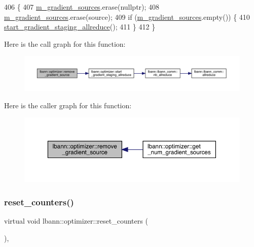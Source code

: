 \begin{DoxyCode}
406                                                          \{
407   \hyperlink{classlbann_1_1optimizer_aadfa322a683c2b826d0fae5f809298df}{m\_gradient\_sources}.erase(\textcolor{keyword}{nullptr});
408   \hyperlink{classlbann_1_1optimizer_aadfa322a683c2b826d0fae5f809298df}{m\_gradient\_sources}.erase(source);
409   \textcolor{keywordflow}{if} (\hyperlink{classlbann_1_1optimizer_aadfa322a683c2b826d0fae5f809298df}{m\_gradient\_sources}.empty()) \{
410     \hyperlink{classlbann_1_1optimizer_a1fe495ccbd62d50735615818abecf454}{start\_gradient\_staging\_allreduce}();
411   \}
412 \}
\end{DoxyCode}
Here is the call graph for this function\+:\nopagebreak
\begin{figure}[H]
\begin{center}
\leavevmode
\includegraphics[width=350pt]{classlbann_1_1optimizer_a68ba7515d7eb4af38ff19607c13a111b_cgraph}
\end{center}
\end{figure}
Here is the caller graph for this function\+:\nopagebreak
\begin{figure}[H]
\begin{center}
\leavevmode
\includegraphics[width=350pt]{classlbann_1_1optimizer_a68ba7515d7eb4af38ff19607c13a111b_icgraph}
\end{center}
\end{figure}
\mbox{\label{classlbann_1_1optimizer_a067709debd4d2e7bfe1a35b5f6ced668}} 
\subsubsection{\texorpdfstring{reset\+\_\+counters()}{reset\_counters()}}
{\footnotesize\ttfamily virtual void lbann\+::optimizer\+::reset\+\_\+counters (\begin{DoxyParamCaption}{ }\end{DoxyParamCaption})\hspace{0.3cm}{\ttfamily [inline]}, {\ttfamily [virtual]}}

